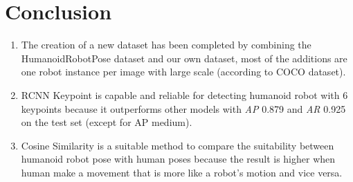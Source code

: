 \section{Conclusion}
\label{sec:conclusion}


\begin{enumerate}

      \item The creation of a new dataset has been completed by combining the HumanoidRobotPose dataset \citep{amini2021} and our own dataset,
            most of the additions are one robot instance per image with large scale (according to COCO dataset).
      \item RCNN Keypoint is capable and reliable for detecting humanoid robot with 6 keypoints because it outperforms other models with \emph{AP} 0.879 and \emph{AR} 0.925 on the test set (except for AP medium).
      \item Cosine Similarity is a suitable method to compare the suitability between humanoid robot pose with human poses because the result is higher when
            human make a movement that is more like a robot's motion and vice versa.
\end{enumerate}